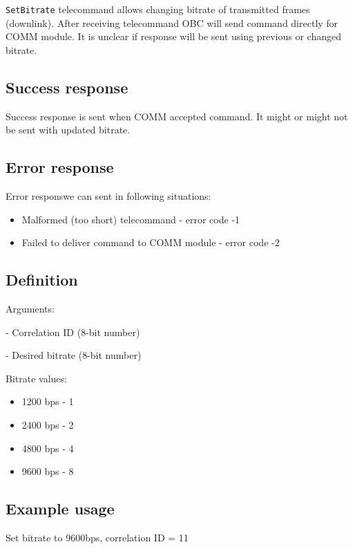 \texttt{SetBitrate} telecommand allows changing bitrate of transmitted frames (downlink). After receiving telecommand OBC will send command directly for COMM module. It is unclear if response will be sent using previous or changed bitrate. 

\subsection{Success response}
Success response is sent when COMM accepted command. It might or might not be sent with updated bitrate.

\subsection{Error response}
Error responswe can sent in following situations:
\begin{itemize}
	\item Malformed (too short) telecommand - error code -1
	\item Failed to deliver command to COMM module - error code -2
\end{itemize}

\subsection{Definition}

Arguments: 
\begin{description}[labelindent=1cm]
	\item[\texttt{correlation\_id}] - Correlation ID (8-bit number)
	\item[\texttt{bitrate}] - Desired bitrate (8-bit number) 
\end{description}

Bitrate values:
\begin{itemize}
	\item 1200 bps - 1
	\item 2400 bps - 2
	\item 4800 bps - 4
	\item 9600 bps - 8
\end{itemize}


\subsection{Example usage}
Set bitrate to 9600bps, correlation ID = 11


